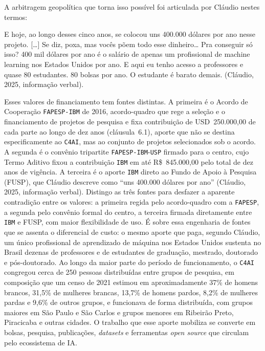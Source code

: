 A arbitragem geopolítica que torna isso possível foi articulada por Cláudio nestes termos:

\begin{citacaoabnt}
E hoje, ao longo desses cinco anos, se colocou uns 400.000 dólares por ano nesse projeto. [\ldots{}] Se diz, poxa, mas vocês põem todo esse dinheiro\ldots{} Pra conseguir só isso? 400 mil dólares por ano é o salário de apenas um profissional de machine learning nos Estados Unidos por ano. E aqui eu tenho acesso a professores e quase 80 estudantes. 80 bolsas por ano. O estudante é barato demais. (Cláudio, 2025, informação verbal).
\end{citacaoabnt}

Esses valores de financiamento tem fontes distintas. A primeira é o Acordo de Cooperação \texttt{FAPESP-IBM} de 2016, acordo-quadro que rege a seleção e o financiamento de projetos de pesquisa e fixa contribuição de USD~250.000,00 de cada parte ao longo de dez anos (cláusula~6.1), aporte que não se destina especificamente ao \texttt{C4AI}, mas ao conjunto de projetos selecionados sob o acordo. A segunda é o convênio tripartite \texttt{FAPESP-IBM}-\texttt{USP} firmado para o centro, cujo Termo Aditivo fixou a contribuição \texttt{IBM} em até R\$~845.000,00 pelo total de dez anos de vigência. A terceira é o aporte \texttt{IBM} direto ao Fundo de Apoio à Pesquisa (FUSP), que Cláudio descreve como \enquote{uns 400.000 dólares por ano} (Cláudio, 2025, informação verbal). Distingo as três fontes para desfazer a aparente contradição entre os valores: a primeira regida pelo acordo-quadro com a \texttt{FAPESP}, a segunda pelo convênio formal do centro, a terceira firmada diretamente entre \texttt{IBM} e FUSP, com maior flexibilidade de uso. É sobre essa engenharia de fontes que se assenta o diferencial de custo: o mesmo aporte que paga, segundo Cláudio, um único profissional de aprendizado de máquina nos Estados Unidos sustenta no Brasil dezenas de professores e de estudantes de graduação, mestrado, doutorado e pós-doutorado. Ao longo da maior parte do período de funcionamento, o \texttt{C4AI} congregou cerca de 250 pessoas distribuídas entre grupos de pesquisa, em composição que um censo de 2021 estimou em aproximadamente 37\% de homens brancos, 31,5\% de mulheres brancas, 13,7\% de homens pardos, 8,2\% de mulheres pardas e 9,6\% de outros grupos, e funcionava de forma distribuída, com grupos maiores em São Paulo e São Carlos e grupos menores em Ribeirão Preto, Piracicaba e outras cidades. O trabalho que esse aporte mobiliza se converte em bolsas, pesquisa, publicações, \textit{datasets} e ferramentas \textit{open source} que circulam pelo ecossistema de IA.

